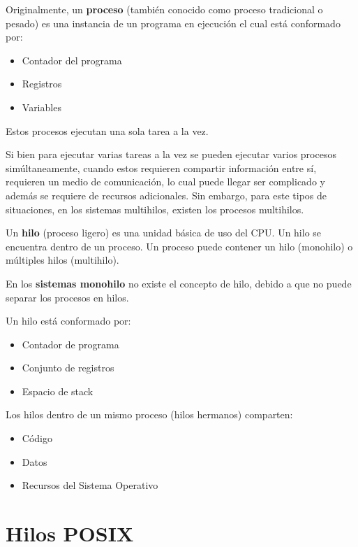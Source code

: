 \documentclass[12pt, a4paper]{article} %
\begin{document}
Originalmente, un \textbf{proceso} (también conocido como proceso tradicional o pesado) es una instancia de un programa en ejecución el cual está conformado por:

\begin{itemize}
	\item Contador del programa
	\item Registros
	\item Variables
\end{itemize}

Estos procesos ejecutan una sola tarea a la vez.

Si bien para ejecutar varias tareas a la vez se pueden ejecutar varios procesos simúltaneamente, cuando estos requieren compartir información entre sí, requieren un medio de comunicación, lo cual puede llegar ser complicado y además se requiere de recursos adicionales. Sin embargo, para este tipos de situaciones, en los sistemas multihilos, existen los procesos multihilos.

Un \textbf{hilo} (proceso ligero) es una unidad básica de uso del CPU. Un hilo se encuentra dentro de un proceso. Un proceso puede contener un hilo (monohilo) o múltiples hilos (multihilo).

\begin{tcolorbox}[colback=blue!5!white,colframe=blue!75!black,title=Nota]
	En los \textbf{sistemas monohilo} no existe el concepto de hilo, debido a que no puede separar los procesos en hilos.
\end{tcolorbox}

Un hilo está conformado por:

\begin{itemize}
	\item Contador de programa
	\item Conjunto de registros
	\item Espacio de stack
\end{itemize}

Los hilos dentro de un mismo proceso (hilos hermanos) comparten:

\begin{itemize}
	\item Código
	\item Datos
	\item Recursos del Sistema Operativo
\end{itemize}

\clearpage
\section{Hilos POSIX}
\end{document}
